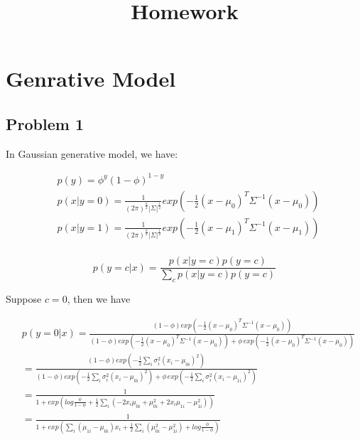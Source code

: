 \documentclass[10pt]{article}
\begin{document}
\title{Homework}

\author{}

\maketitle

\section{Genrative Model}
\subsection{Problem 1}

In Gaussian generative model, we have:

\begin{equation}
\begin{aligned}
& p(y)=\phi^{y}(1-\phi)^{1-y} \\
& p(x|y=0) = \frac{1}{(2\pi)^{\frac{n}{2}} |\Sigma|^{\frac{1}{2}}}exp(-\frac{1}{2}(x-\mu_{0})^{T}\Sigma^{-1}(x-\mu_0)) \\
& p(x|y=1) = \frac{1}{(2\pi)^{\frac{n}{2}} |\Sigma|^{\frac{1}{2}}}exp(-\frac{1}{2}(x-\mu_{1})^{T}\Sigma^{-1}(x-\mu_1)) \\
\end{aligned}
\end{equation}

\begin{equation}
p(y=c|x)=\frac{p(x|y=c)p(y=c)}{\displaystyle\sum_{c}p(x|y=c)p(y=c)}
\end{equation}

Suppose $c=0$, then we have

\begin{equation}
\begin{aligned}
& p(y=0|x)=\frac{(1-\phi)exp(-\frac{1}{2}(x-\mu_{0})^{T}\Sigma^{-1}(x-\mu_0))}{(1-\phi)exp(-\frac{1}{2}(x-\mu_{0})^{T}\Sigma^{-1}(x-\mu_0)) + \phi\,exp(-\frac{1}{2}(x-\mu_{0})^{T}\Sigma^{-1}(x-\mu_0))} \\
& = \frac{(1-\phi)exp(-\frac{1}{2}\displaystyle\sum_{i}{\sigma_{i}^{2}(x_{i}-\mu_{0i})^2})}{(1-\phi)exp(-\frac{1}{2}\displaystyle\sum_{i}{\sigma_{i}^{2}(x_{i}-\mu_{0i})^2}) + \phi\,exp(-\frac{1}{2}\displaystyle\sum_{i}{\sigma_{i}^{2}(x_{i}-\mu_{1i})^2})} \\
& = \frac{1}{1 + exp(log\frac{\phi}{1-\phi}+\frac{1}{2}\displaystyle\sum_{i}(-2x_{i}\mu_{0i}+\mu_{0i}^{2} + 2x_{i}\mu_{1i} - \mu_{1i}^{2}))} \\
& =\frac{1}{1+exp(\displaystyle\sum_{i}(\mu_{1i}-\mu_{0i})x_{i}+\frac{1}{2}\displaystyle\sum_{i}(\mu_{0i}^{2}-\mu_{1i}^{2})+log\frac{\phi}{1-\phi})} \\
\end{aligned}
\end{equation}
\end{document}
